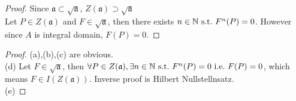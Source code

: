 \documentclass[leqno]{ltjsarticle}
\begin{document}
\begin{proof}
	Since $\mathfrak a \subset \sqrt{\mathfrak a}$, $Z(\mathfrak a) \supset \sqrt{\mathfrak a}$\\
	Let $P\in Z(\mathfrak a)$ and $F \in \sqrt{\mathfrak a}$, then there exists $n\in\mathbb N\ \mathrm{s.t.}\  F^n(P) = 0$. However since $A$ is integral domain, $F(P)=0$.
\end{proof}
\begin{proof}
	(a),(b),(c) are obvious.\\
	(d)	Let $F\in\sqrt{\mathfrak a}$, then $\forall P\in Z(\mathfrak a),\exists n\in\mathbb N\ \mathrm{s.t.}\  F^n(P)=0\ \mathrm{i.e.}\  F(P)=0$, which means $F\in I(Z(\mathfrak a))$. Inverse proof is Hilbert Nullstellnsatz.\\
	(e)
\end{proof}
\end{document}
